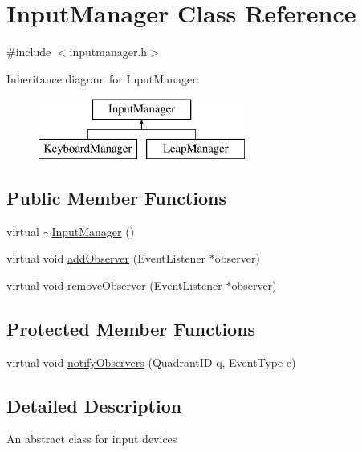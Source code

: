 \hypertarget{class_input_manager}{\section{Input\+Manager Class Reference}
\label{class_input_manager}
}


{\ttfamily \#include $<$inputmanager.\+h$>$}

Inheritance diagram for Input\+Manager\+:\begin{figure}[H]
\begin{center}
\leavevmode
\includegraphics[height=2.000000cm]{class_input_manager}
\end{center}
\end{figure}
\subsection*{Public Member Functions}
\begin{DoxyCompactItemize}
\item 
virtual \hyperlink{class_input_manager_adf6f0d9103512c1bd7d89c54ddd299fe}{$\sim$\+Input\+Manager} ()
\item 
virtual void \hyperlink{class_input_manager_a9e689d7906407b5c0de0d384d457dbd6}{add\+Observer} (Event\+Listener $\ast$observer)
\item 
virtual void \hyperlink{class_input_manager_a35582c7c194fb8af1c649556e4935d08}{remove\+Observer} (Event\+Listener $\ast$observer)
\end{DoxyCompactItemize}
\subsection*{Protected Member Functions}
\begin{DoxyCompactItemize}
\item 
virtual void \hyperlink{class_input_manager_a4040fa67ecc810c5da6110ecf42b8bc7}{notify\+Observers} (Quadrant\+I\+D q, Event\+Type e)
\end{DoxyCompactItemize}


\subsection{Detailed Description}
An abstract class for input devices 

